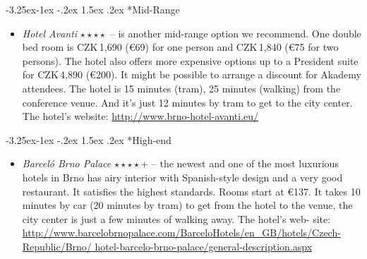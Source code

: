 \documentclass[10pt,a4paper]{article}
\makeatletter
\renewcommand\subsection{%
\@startsection{subsection}{2}{\z@}%
              {-3.25ex\@plus -1ex \@minus -.2ex}%
              {1.5ex \@plus .2ex}%
              {\color{kdelight}\sffamily\Large\bfseries}}
\makeatother
\begin{document}
\begin{figure}[ht]
\begin{center}
\end{center}
\end{figure}

\subsection*{Mid-Range}
\begin{itemize}
\item \emph{Hotel Avanti} $\star\star\star\star{}$ -- is another mid-range option we recommend. One
double bed room is CZK\,1,690 (\euro{69}) for one person and CZK\,1,840
(\euro{75} for two persons). The hotel also offers more expensive
options up to a President suite for CZK\,4,890 (\euro{200}). It might be possible
to arrange a discount for Akademy attendees. The hotel is 15
minutes (tram), 25 minutes (walking) from the conference venue. And it's
just 12 minutes by tram to get to the city center. The hotel's website:
\url{http://www.brno-hotel-avanti.eu/}
\end{itemize}


\begin{figure}[ht]
\begin{center}
\end{center}
\end{figure}

\subsection*{High-end}
\begin{itemize}
\item \emph{Barceló Brno Palace} $\star\star\star\star{}$+ -- the newest and one of the most luxurious hotels in Brno
has airy interior with Spanish-style design and a very good restaurant. It satisfies the highest
standards. Rooms start at \euro{137}. It takes 10 minutes by car (20 minutes by tram) to get from
the hotel to the venue, the city center is just a few minutes of walking away. The hotel's web-
site: \sloppy \url{http://www.barcelobrnopalace.com/BarceloHotels/en\_GB/hotels/Czech-Republic/Brno/
hotel-barcelo-brno-palace/general-description.aspx}
\end{itemize}

\begin{figure}[ht]
\begin{center}
\end{center}
\end{figure}
\end{document}
